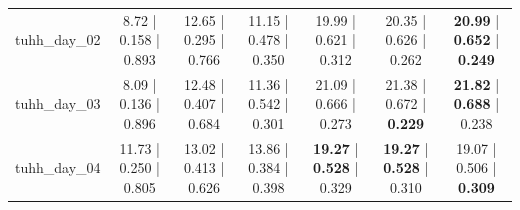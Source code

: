 \begin{table}[htbp]
{\begin{tabular}{lcccccc}
tuhh\_day\_02 & 8.72 | 0.158 | 0.893 & 12.65 | 0.295 | 0.766 & 11.15 | 0.478 | 0.350 & 19.99 | 0.621 | 0.312 & 20.35 | 0.626 | 0.262 & \textbf{20.99} | \textbf{0.652} | \textbf{0.249} \\
tuhh\_day\_03 & 8.09 | 0.136 | 0.896 & 12.48 | 0.407 | 0.684 & 11.36 | 0.542 | 0.301 & 21.09 | 0.666 | 0.273 & 21.38 | 0.672 | \textbf{0.229} & \textbf{21.82} | \textbf{0.688} | 0.238 \\
tuhh\_day\_04 & 11.73 | 0.250 | 0.805 & 13.02 | 0.413 | 0.626 & 13.86 | 0.384 | 0.398 & \textbf{19.27} | \textbf{0.528} | 0.329 & \textbf{19.27} | \textbf{0.528} | 0.310 & 19.07 | 0.506 | \textbf{0.309} \\
\bottomrule
\end{tabular}%
}
\end{table}
